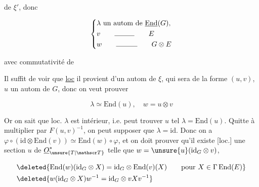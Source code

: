 de $\xi'$, donc

\[
\left\{\begin{aligned}
&\lambda\ \text{un autom de }\underline{\mathrm{End}}(G),\\
&v\qquad\rule{2.8em}{.35pt}\qquad E\\
&w\qquad\rule{3em}{.35pt}\qquad G\otimes E
\end{aligned}\right.
\]

avec commutativité de


 Il suffit de voir que \uline{loc} il provient d'un 
autom de $\xi$, qui sera de la forme $(u,v)$, $u$ un autom
de $G$, donc on veut prouver

\[
\lambda\simeq\mathrm{End}(u),\quad w=u\otimes v
\]

Or on sait que loc. $\lambda$ est  intérieur, i.e.  
 peut trouver $u$ tel $\lambda=\mathrm{End}(u)$. Quitte à multiplier \inserted{$\sigma$} par
$F(u,v)^{-1}$, on peut supposer que $\lambda=\mathrm{id}$. Donc on  a
$\varphi\circ(\mathrm{id}\otimes\mathrm{End}(v))\simeq\mathrm{End}(w)\circ\varphi$, et on doit prouver qu'il existe [loc.]
une section $u$ de $\underline O_{\unsure{T|\mathscr T}}^{*}$ telle que $w=\unsure{u}( \mathrm{id}_{G}\otimes v)$,  


\[
\begin{aligned}
&\deleted{\mathrm{End}(w)(\mathrm{id}_G\otimes X)=\mathrm{id}_G\otimes\mathrm{End}(v)(X)\qquad \text{pour }X\in\Gamma\,\mathrm{End}(E)}\\
&\deleted{w(\mathrm{id}_G\otimes X)w^{-1}=\mathrm{id}_G\otimes vXv^{-1}}
\end{aligned}
\]


